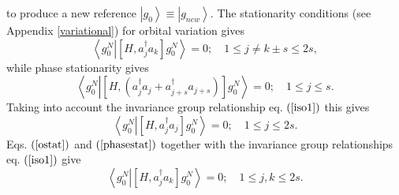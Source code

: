 \documentclass[aps,preprint]{revtex4}%
\begin{document}
to produce a new reference $\left\vert g_{0}\right\rangle \equiv\left\vert
g_{new}\right\rangle .$ The stationarity conditions (see Appendix
\ref{variational}) for orbital variation gives
\begin{equation}
\left\langle g_{0}^{N}\left\vert \left[  H,a_{j}^{\dagger}a_{k}\right]
g_{0}^{N}\right.  \right\rangle =0;\quad1\leq j\neq k\pm s\leq2s,
\label{ostat}%
\end{equation}
while phase stationarity gives%
\begin{equation}
\left\langle g_{0}^{N}\left\vert \left[  H,\left(  a_{j}^{\dagger}%
a_{j}+a_{j+s}^{\dagger}a_{j+s}\right)  \right]  g_{0}^{N}\right.
\right\rangle =0;\quad1\leq j\leq s.
\end{equation}
Taking into account the invariance group relationship eq. $\left(
\ref{iso1}\right)  $ this gives
\begin{equation}
\left\langle g_{0}^{N}\left\vert \left[  H,a_{j}^{\dagger}a_{j}\right]
g_{0}^{N}\right.  \right\rangle =0;\quad1\leq j\leq2s. \label{phasestat}%
\end{equation}
Eqs. $\left(  \ref{ostat}\right)  $ and $\left(  \ref{phasestat}\right)  $
together with the invariance group relationships eq. $\left(  \ref{iso1}%
\right)  $ give
\begin{equation}
\left\langle g_{0}^{N}\left\vert \left[  H,a_{j}^{\dagger}a_{k}\right]
g_{0}^{N}\right.  \right\rangle =0;\quad1\leq j,k\leq2s. \label{orbstat}%
\end{equation}
\end{document}
